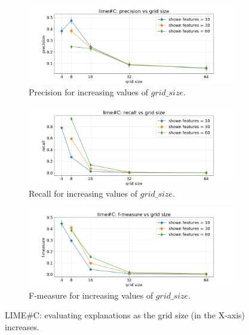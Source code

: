 \documentclass[12pt, twoside, a4paper]{report}
\begin{document}
\begin{figure}[h]
\begin{subfigure}[b]{\linewidth}
\includegraphics[width=\linewidth]{images/figs/VSGRID/limesharpC/limesharpC: precision vs grid size.png} 
\caption{Precision for increasing values of $grid\_size$.}
\label{subfig:limesharp_C_prec_vs_gs}
\end{subfigure}
\begin{subfigure}[b]{\linewidth}
\includegraphics[width=\linewidth]{images/figs/VSGRID/limesharpC/limesharpC: recall vs grid size.png} 
\caption{Recall for increasing values of $grid\_size$.}
\label{subfig:limesharp_C_rec_vs_gs}
\end{subfigure}
\begin{subfigure}[b]{\linewidth}
\includegraphics[width=\linewidth]{images/figs/VSGRID/limesharpC/limesharpC: f-measure vs grid size.png} 
\caption{F-measure for increasing values of $grid\_size$.}
\label{subfig:limesharp_C_fmea_vs_gs}
\end{subfigure}
\caption{LIME\#C: evaluating explanations as the grid size (in the X-axis) increases.}
\label{fig:limesharp_C_vs_gs}
\end{figure}
\end{document}
